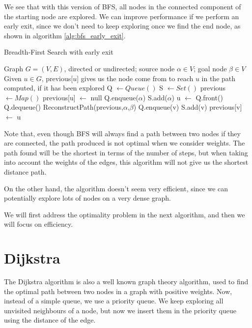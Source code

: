 \documentclass[12pt]{report}
\begin{document}
We see that with this version of BFS, all nodes in the connected component of the starting node are explored. We can improve performance if we perform an early exit, since we don't need to keep exploring once we find the end node, as shown in algorithm \ref{alg:bfs_early_exit}.

\begin{algorithm}
\caption{Breadth-First Search with early exit}
\label{alg:bfs_early_exit}
\begin{algorithmic}[1]
\Require Graph $G = (V, E)$, directed or undirected; source node $\alpha \in V$; goal node $\beta \in V$
\Ensure Given $u \in G$, previous[$u$] gives us the node come from to reach $u$ in the path computed, if it has been explored
\State Q $\gets Queue()$
\State S $\gets Set()$
\State previous $\gets Map()$
	\State previous[u] $\gets$ null
\EndFor
\State Q.enqueue($\alpha$)
\State S.add($\alpha$)
	\State u $\gets$ Q.front()
	\State Q.dequeue()
			 
				\State \Return ReconstructPath(previous,$\alpha$,$\beta$)
			\EndIf
			\State Q.enqueue(v)
			\State S.add(v)
			\State previous[v] $\gets$ u
		\EndIf
	\EndFor
\EndWhile
\EndProcedure
\end{algorithmic}
\end{algorithm}

Note that, even though BFS will always find a path between two nodes if they are connected, the path produced is not optimal when we consider weights. The path found will be the shortest in terms of the number of steps, but when taking into account the weights of the edges, this algorithm will not give us the shortest distance path.


On  the other hand, the algorithm doesn't seem very efficient, since we can potentially explore lots of nodes on a very dense graph.

We will first address the optimality problem in the next algorithm, and then we will focus on efficiency.

\section{Dijkstra}
The Dijkstra algorithm is also a well known graph theory algorithm, used to find the optimal path between two nodes in a graph with positive weights. Now, instead of a simple queue, we use a priority queue. We keep exploring all unvisited neighbours of a node, but now we insert them in the priority queue using the distance of the edge.
\end{document}
